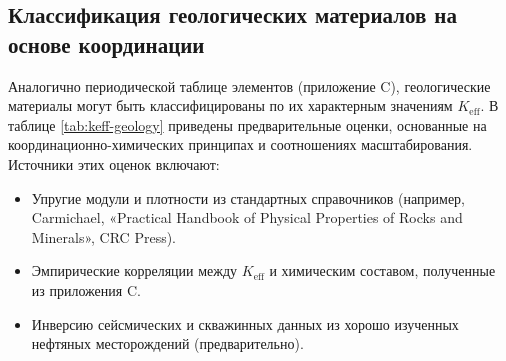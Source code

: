 \documentclass[12pt,a4paper]{article}
\theoremstyle{remark}
\newcommand{\Keff}{K_{\mathrm{eff}}}
\begin{document}
	\subsection{Классификация геологических материалов на основе координации}
	
	Аналогично периодической таблице элементов (приложение C), геологические материалы могут быть классифицированы по их характерным значениям \(\Keff\). В таблице \ref{tab:keff-geology} приведены предварительные оценки, основанные на координационно-химических принципах и соотношениях масштабирования. Источники этих оценок включают:
	\begin{itemize}
		\item Упругие модули и плотности из стандартных справочников (например, Carmichael, «Practical Handbook of Physical Properties of Rocks and Minerals», CRC Press).
		\item Эмпирические корреляции между \(\Keff\) и химическим составом, полученные из приложения C.
		\item Инверсию сейсмических и скважинных данных из хорошо изученных нефтяных месторождений (предварительно).
	\end{itemize}
	
\end{document}
